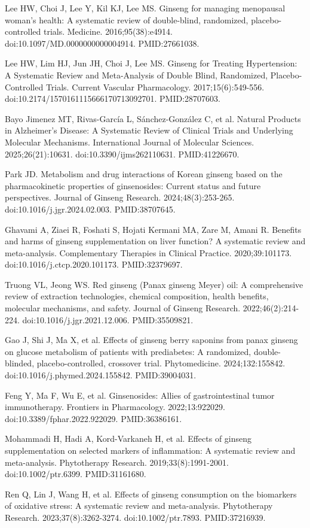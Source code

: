 \documentclass[11pt,oneside]{book}
\newcommand{\reff}[2]{\par\hangindent=7mm\hangafter=1\noindent[#1]\hspace{2mm}#2\par}
\begin{document}
\reff{56}{Lee HW, Choi J, Lee Y, Kil KJ, Lee MS. Ginseng for managing menopausal woman's health: A systematic review of double-blind, randomized, placebo-controlled trials. Medicine. 2016;95(38):e4914. doi:10.1097/MD.0000000000004914. PMID:27661038.}
\reff{57}{Lee HW, Lim HJ, Jun JH, Choi J, Lee MS. Ginseng for Treating Hypertension: A Systematic Review and Meta-Analysis of Double Blind, Randomized, Placebo-Controlled Trials. Current Vascular Pharmacology. 2017;15(6):549-556. doi:10.2174/1570161115666170713092701. PMID:28707603.}
\reff{58}{Bayo Jimenez MT, Rivas-García L, Sánchez-González C, et al. Natural Products in Alzheimer's Disease: A Systematic Review of Clinical Trials and Underlying Molecular Mechanisms. International Journal of Molecular Sciences. 2025;26(21):10631. doi:10.3390/ijms262110631. PMID:41226670.}
\reff{59}{Park JD. Metabolism and drug interactions of Korean ginseng based on the pharmacokinetic properties of ginsenosides: Current status and future perspectives. Journal of Ginseng Research. 2024;48(3):253-265. doi:10.1016/j.jgr.2024.02.003. PMID:38707645.}
\reff{60}{Ghavami A, Ziaei R, Foshati S, Hojati Kermani MA, Zare M, Amani R. Benefits and harms of ginseng supplementation on liver function? A systematic review and meta-analysis. Complementary Therapies in Clinical Practice. 2020;39:101173. doi:10.1016/j.ctcp.2020.101173. PMID:32379697.}
\reff{61}{Truong VL, Jeong WS. Red ginseng (Panax ginseng Meyer) oil: A comprehensive review of extraction technologies, chemical composition, health benefits, molecular mechanisms, and safety. Journal of Ginseng Research. 2022;46(2):214-224. doi:10.1016/j.jgr.2021.12.006. PMID:35509821.}
\reff{62}{Gao J, Shi J, Ma X, et al. Effects of ginseng berry saponins from panax ginseng on glucose metabolism of patients with prediabetes: A randomized, double-blinded, placebo-controlled, crossover trial. Phytomedicine. 2024;132:155842. doi:10.1016/j.phymed.2024.155842. PMID:39004031.}
\reff{63}{Feng Y, Ma F, Wu E, et al. Ginsenosides: Allies of gastrointestinal tumor immunotherapy. Frontiers in Pharmacology. 2022;13:922029. doi:10.3389/fphar.2022.922029. PMID:36386161.}
\reff{64}{Mohammadi H, Hadi A, Kord-Varkaneh H, et al. Effects of ginseng supplementation on selected markers of inflammation: A systematic review and meta-analysis. Phytotherapy Research. 2019;33(8):1991-2001. doi:10.1002/ptr.6399. PMID:31161680.}
\reff{65}{Ren Q, Lin J, Wang H, et al. Effects of ginseng consumption on the biomarkers of oxidative stress: A systematic review and meta-analysis. Phytotherapy Research. 2023;37(8):3262-3274. doi:10.1002/ptr.7893. PMID:37216939.}
\end{document}
